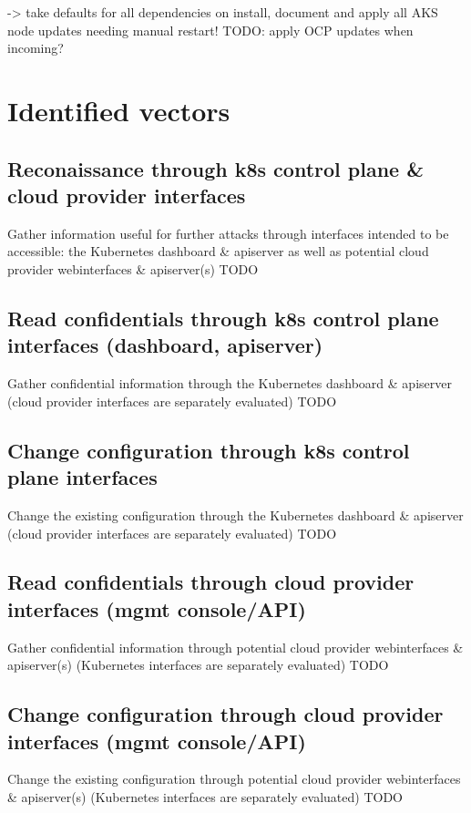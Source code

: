 -> take defaults for all dependencies on install, document and apply all AKS node updates needing manual restart!
TODO: apply OCP updates when incoming?

\section{Identified vectors}

\subsection{Reconaissance through k8s control plane \& cloud provider interfaces}
Gather information useful for further attacks through interfaces intended to be accessible: the Kubernetes dashboard & apiserver as well as potential cloud provider webinterfaces & apiserver(s)
TODO

\subsection{Read confidentials through k8s control plane interfaces (dashboard, apiserver)}
Gather confidential information through the Kubernetes dashboard & apiserver (cloud provider interfaces are separately evaluated)
TODO

\subsection{Change configuration through k8s control plane interfaces}
Change the existing configuration through the Kubernetes dashboard & apiserver (cloud provider interfaces are separately evaluated)
TODO

\subsection{Read confidentials through cloud provider interfaces (mgmt console/API)}
Gather confidential information through potential cloud provider webinterfaces & apiserver(s) (Kubernetes interfaces are separately evaluated)
TODO

\subsection{Change configuration through  cloud provider interfaces (mgmt console/API)}
Change the existing configuration through potential cloud provider webinterfaces & apiserver(s) (Kubernetes interfaces are separately evaluated)
TODO

